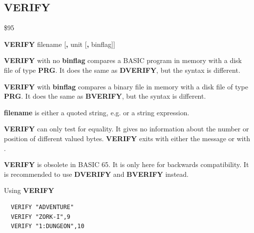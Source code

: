 \subsection{VERIFY}
\begin{description}[leftmargin=2cm,style=nextline]
\item [Token:] \$95
\item [Format:] {\bf VERIFY} filename [{\bf,} unit [{\bf,} binflag]]
\item [Usage:] {\bf VERIFY} with no {\bf binflag} compares a BASIC program
                in memory with a disk file of type {\bf PRG}.
                It does the same as {\bf DVERIFY}, but the syntax is different.

               {\bf VERIFY} with {\bf binflag} compares a binary file
               in memory with a disk file of type {\bf PRG}.
               It does the same as {\bf BVERIFY}, but the syntax is different.

               {\bf filename} is either a quoted string, e.g.  or
               a string expression.

               \unitdefinition

\item [Remarks:]
   {\bf VERIFY} can only test for equality. It gives no information
   about the number or position of different valued bytes.
    {\bf VERIFY} exits with either the message 
   or with .

   {\bf VERIFY} is obsolete in BASIC 65. It is only here for backwards
    compatibility. It is recommended to use {\bf DVERIFY} and {\bf BVERIFY} instead.

\item [Examples:] Using {\bf VERIFY}
\begin{tcolorbox}[colback=black,coltext=white]
\verbatimfont{\codefont}
\begin{verbatim}
  VERIFY "ADVENTURE"
  VERIFY "ZORK-I",9
  VERIFY "1:DUNGEON",10
\end{verbatim}
\end{tcolorbox}
\end{description}


\newpage
